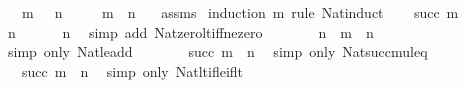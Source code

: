 \begin{isabellebody}
\ \ \ {\isachardoublequoteopen}m\ {\isasymnoteq}\ {}{\isachardoublequoteclose}\ {\isachardoublequoteopen}n\ {\isasymnoteq}\ {}{\isachardoublequoteclose}\isanewline
\ \ \ {\isachardoublequoteopen}m\ {\isacharasterisk}{\kern0pt}\ n\ {\isasymnoteq}\ {}{\isachardoublequoteclose}\isanewline
%
\isadelimproof
%
\endisadelimproof
%
\isatagproof
{}\isamarkupfalse%
\ assms\isanewline
{}\isamarkupfalse%
\ {\isacharparenleft}{\kern0pt}induction\ m\ rule{\isacharcolon}{\kern0pt}\ Nat{\isacharunderscore}{\kern0pt}induct{\isacharparenright}{\kern0pt}\isanewline
\ \ \isamarkupfalse%
\ {\isacharparenleft}{\kern0pt}succ\ m{\isacharparenright}{\kern0pt}\isanewline
\ \ \isamarkupfalse%
\ {\isacartoucheopen}n\ {\isasymnoteq}\ {}{\isacartoucheclose}\ \isamarkupfalse%
\ {\isachardoublequoteopen}{}\ {\isacharless}{\kern0pt}\ n{\isachardoublequoteclose}\ \isamarkupfalse%
\ {\isacharparenleft}{\kern0pt}simp\ add{\isacharcolon}{\kern0pt}\ Nat{\isacharunderscore}{\kern0pt}zero{\isacharunderscore}{\kern0pt}lt{\isacharunderscore}{\kern0pt}iff{\isacharunderscore}{\kern0pt}ne{\isacharunderscore}{\kern0pt}zero{\isacharparenright}{\kern0pt}\isanewline
\ \ \isamarkupfalse%
\ \isamarkupfalse%
\ {\isachardoublequoteopen}{\isachardot}{\kern0pt}{\isachardot}{\kern0pt}{\isachardot}{\kern0pt}\ {\isasymle}\ n\ {\isacharplus}{\kern0pt}\ m\ {\isacharasterisk}{\kern0pt}\ n{\isachardoublequoteclose}\ \isamarkupfalse%
\ {\isacharparenleft}{\kern0pt}simp\ only{\isacharcolon}{\kern0pt}\ Nat{\isacharunderscore}{\kern0pt}le{\isacharunderscore}{\kern0pt}add{\isacharparenright}{\kern0pt}\isanewline
\ \ \isamarkupfalse%
\ \isamarkupfalse%
\ {\isachardoublequoteopen}{\isachardot}{\kern0pt}{\isachardot}{\kern0pt}{\isachardot}{\kern0pt}\ {\isacharequal}{\kern0pt}\ succ\ m\ {\isacharasterisk}{\kern0pt}\ n{\isachardoublequoteclose}\ \isamarkupfalse%
\ {\isacharparenleft}{\kern0pt}simp\ only{\isacharcolon}{\kern0pt}\ Nat{\isacharunderscore}{\kern0pt}succ{\isacharunderscore}{\kern0pt}mul{\isacharunderscore}{\kern0pt}eq{\isacharparenright}{\kern0pt}\isanewline
\ \ \isamarkupfalse%
\ \isamarkupfalse%
\ {\isachardoublequoteopen}{}\ {\isacharless}{\kern0pt}\ succ\ m\ {\isacharasterisk}{\kern0pt}\ n{\isachardoublequoteclose}\ \isamarkupfalse%
\ {\isacharparenleft}{\kern0pt}simp\ only{\isacharcolon}{\kern0pt}\ Nat{\isacharunderscore}{\kern0pt}lt{\isacharunderscore}{\kern0pt}if{\isacharunderscore}{\kern0pt}le{\isacharunderscore}{\kern0pt}if{\isacharunderscore}{\kern0pt}lt{\isacharparenright}{\kern0pt}\isanewline

\end{isabellebody}

